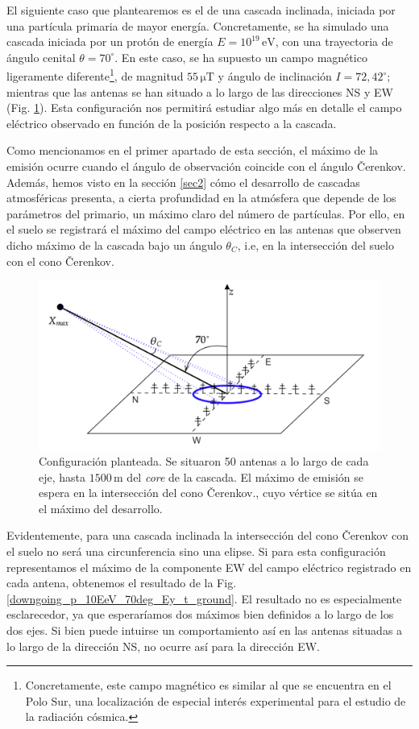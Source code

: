\documentclass[12 pt, a4paper]{article} %
\numberwithin{equation}{section}
\numberwithin{figure}{section}
\numberwithin{table}{section}
\begin{document}
El siguiente caso que plantearemos es el de una cascada inclinada, iniciada por una partícula primaria de mayor energía. Concretamente, se ha simulado una cascada iniciada por un protón de energía $E=10^{19}\,\mathrm{eV}$, con una trayectoria de ángulo cenital $\theta=70^{\circ}$. En este caso, se ha supuesto un campo magnético ligeramente diferente\footnote{ Concretamente, este campo magnético es similar al que se encuentra en el Polo Sur, una localización de especial interés experimental para el estudio de la radiación cósmica.}, de magnitud $55\,\mathrm{\mu T}$ y ángulo de inclinación $I = 72,42^\circ$; mientras que las antenas se han situado a lo largo de las direcciones NS y EW (Fig. \ref{ANITApaper_showscheme}). Esta configuración nos permitirá estudiar algo más en detalle el campo eléctrico observado en función de la posición respecto a la cascada.

Como mencionamos en el primer apartado de esta sección, el máximo de la emisión ocurre cuando el ángulo de observación coincide con el ángulo \v{C}erenkov. Además, hemos visto en la sección \ref{sec2} cómo el desarrollo de cascadas atmosféricas presenta, a cierta profundidad en la atmósfera que depende de los parámetros del primario, un máximo claro del número de partículas. Por ello, en el suelo se registrará el máximo del campo eléctrico en las antenas que observen dicho máximo de la cascada bajo un ángulo $\theta_C$, i.e, en la intersección del suelo con el cono \v{C}erenkov. 
\begin{figure}[H]
	\centering
	\includegraphics[width=.65\linewidth]{figures/radio/ANITApaper_showscheme}
	\caption{Configuración planteada. Se situaron 50 antenas a lo largo de cada eje, hasta $1500\,\mathrm{m}$ del \textit{core} de la cascada. El máximo de emisión se espera en la intersección del cono \v{C}erenkov., cuyo vértice se sitúa en el máximo del desarrollo.}
	\label{ANITApaper_showscheme}
\end{figure}

Evidentemente, para una cascada inclinada la intersección del cono \v{C}erenkov con el suelo no será una circunferencia sino una elipse. Si para esta configuración representamos el máximo de la componente EW del campo eléctrico registrado en cada antena, obtenemos el resultado de la Fig. \ref{downgoing_p_10EeV_70deg_Ey_t_ground}. El resultado no es especialmente esclarecedor, ya que esperaríamos dos máximos bien definidos a lo largo de los dos ejes. Si bien puede intuirse un comportamiento así en las antenas situadas a lo largo de la dirección NS, no ocurre así para la dirección EW.
\end{document}
